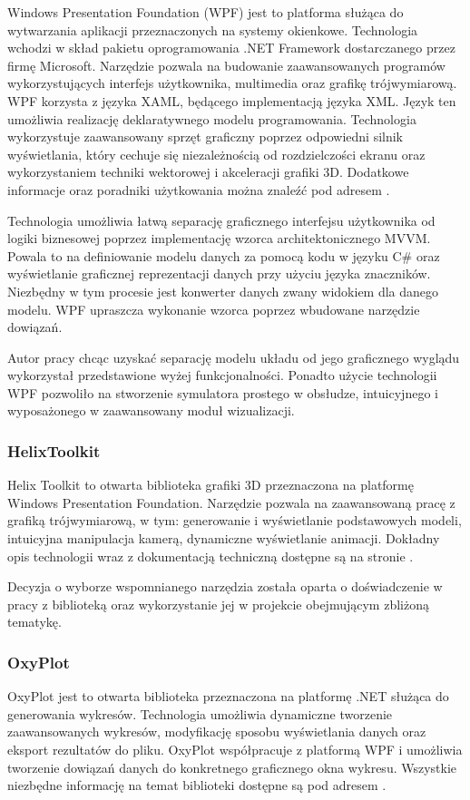 \documentclass[12pt, oneside]{report}
\theoremstyle{definition}
\begin{document}
Windows Presentation Foundation (WPF) jest to platforma służąca do wytwarzania aplikacji przeznaczonych na systemy okienkowe. Technologia wchodzi w skład pakietu oprogramowania .NET Framework dostarczanego przez firmę Microsoft. Narzędzie pozwala na budowanie zaawansowanych programów wykorzystujących interfejs użytkownika, multimedia oraz grafikę trójwymiarową. WPF korzysta z języka XAML, będącego implementacją języka XML. Język ten umożliwia realizację deklaratywnego modelu programowania. Technologia wykorzystuje zaawansowany sprzęt graficzny poprzez odpowiedni silnik wyświetlania, który cechuje się niezależnością od rozdzielczości ekranu oraz wykorzystaniem techniki wektorowej i akceleracji grafiki 3D. Dodatkowe informacje oraz poradniki użytkowania można znaleźć pod adresem \cite{WPF}.

Technologia umożliwia łatwą separację graficznego interfejsu użytkownika od logiki biznesowej poprzez implementację wzorca architektonicznego MVVM. Powala to na definiowanie modelu danych za pomocą kodu w języku C\# oraz wyświetlanie graficznej reprezentacji danych przy użyciu języka znaczników. Niezbędny w tym procesie jest konwerter danych zwany widokiem dla danego modelu. WPF upraszcza wykonanie wzorca poprzez wbudowane narzędzie dowiązań.

Autor pracy chcąc uzyskać separację modelu układu od jego graficznego wyglądu wykorzystał przedstawione wyżej funkcjonalności. Ponadto użycie technologii WPF pozwoliło na stworzenie symulatora prostego w obsłudze, intuicyjnego i wyposażonego w zaawansowany moduł wizualizacji.

\subsubsection{HelixToolkit}
Helix Toolkit to otwarta biblioteka grafiki 3D przeznaczona na platformę Windows Presentation Foundation. Narzędzie pozwala na zaawansowaną pracę z grafiką trójwymiarową, w tym: generowanie i wyświetlanie podstawowych modeli, intuicyjna manipulacja kamerą, dynamiczne wyświetlanie animacji. Dokładny opis technologii wraz z dokumentacją techniczną dostępne są na stronie \cite{HelixToolkit}.

Decyzja o wyborze wspomnianego narzędzia została oparta o doświadczenie w pracy z biblioteką oraz wykorzystanie jej w projekcie obejmującym zbliżoną tematykę.

\subsubsection{OxyPlot}
OxyPlot jest to otwarta biblioteka przeznaczona na platformę .NET służąca do generowania wykresów. Technologia umożliwia dynamiczne tworzenie zaawansowanych wykresów, modyfikację sposobu wyświetlania danych oraz eksport rezultatów do pliku. OxyPlot współpracuje z platformą WPF i umożliwia tworzenie dowiązań danych do konkretnego graficznego okna wykresu. Wszystkie niezbędne informację na temat biblioteki dostępne są pod adresem \cite{OxyPlot}.
\end{document}
